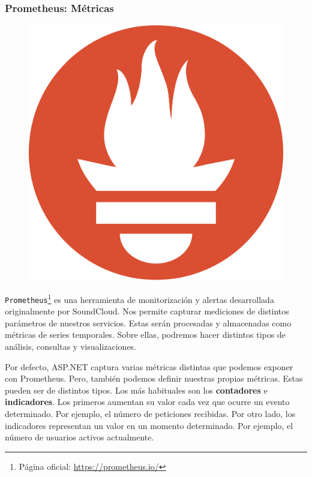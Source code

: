 \subsubsection{Prometheus: Métricas}

\begin{figure}
  \vspace{-12pt}
  \centering
  \includegraphics[scale=0.025]{cap_despliegue/images/prometheus-logo}
\end{figure}

\texttt{Prometheus}\footnote{Página oficial: \url{https://prometheus.io/}} es una herramienta de monitorización y alertas desarrollada originalmente por SoundCloud. Nos permite capturar mediciones de distintos parámetros de nuestros servicios. Estas serán procesadas y almacenadas como métricas de series temporales. Sobre ellas, podremos hacer distintos tipos de análisis, consultas y visualizaciones.

Por defecto, ASP.NET captura varias métricas distintas que podemos exponer con Prometheus. Pero, también podemos definir nuestras propias métricas. Estas pueden ser de distintos tipos. Los más habituales son los \textbf{contadores} e \textbf{indicadores}. \cite{parkerProblemDistributedTracing2020} Los primeros aumentan su valor cada vez que ocurre un evento determinado. Por ejemplo, el número de peticiones recibidas. Por otro lado, los indicadores representan un valor en un momento determinado. Por ejemplo, el número de usuarios activos actualmente.

